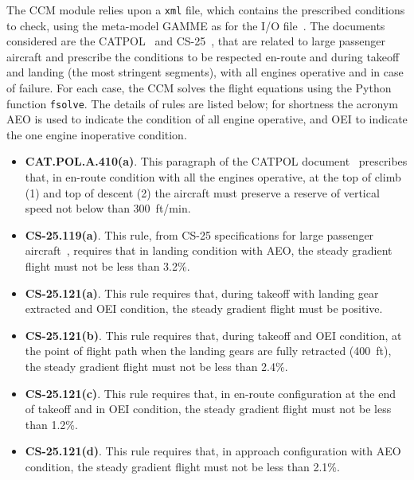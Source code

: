 The CCM module relies upon a \texttt{xml} file, which contains the prescribed conditions to check, using the meta-model GAMME as for the I/O file~\cite{bib:bedouet}.
The documents considered are the CATPOL~\cite{bib:catpol} and CS-25~\cite{bib:cs25}, that are related to large passenger aircraft and prescribe the conditions to be respected en-route and during takeoff and landing (the most stringent segments), with all engines operative and in case of failure. 
For each case, the CCM solves the flight equations using the Python function \texttt{fsolve}.
The details of rules are listed below; for shortness the acronym AEO is used to indicate the condition of all engine operative, and OEI to indicate the one engine inoperative condition. 
\begin{itemize}
	\item \textbf{CAT.POL.A.410(a)}. This paragraph of the CATPOL document~\cite{bib:catpol} prescribes that, in en-route condition with all the engines operative, at the top of climb (1) and top of descent (2) the aircraft must preserve a reserve of vertical speed not below than 300~ft/min.
	
	\item \textbf{CS-25.119(a)}. This rule, from CS-25 specifications for large passenger aircraft~\cite{bib:cs25}, requires that in landing condition with AEO, the steady gradient flight must not be less than 3.2\%.
	
	\item \textbf{CS-25.121(a)}. This rule requires that, during takeoff with landing gear extracted and OEI condition, the steady gradient flight must be positive. 
	
	\item \textbf{CS-25.121(b)}. This rule requires that, during takeoff and OEI condition, at the point of flight path when the landing gears are fully retracted (400~ft), the steady gradient flight must not be less than 2.4\%.
	
	\item \textbf{CS-25.121(c)}. This rule requires that, in en-route configuration at the end of takeoff and in OEI condition, the steady gradient flight must not be less than 1.2\%.
	
	\item \textbf{CS-25.121(d)}. This rule requires that, in approach configuration with AEO condition, the steady gradient flight must not be less than 2.1\%.
\end{itemize} 

